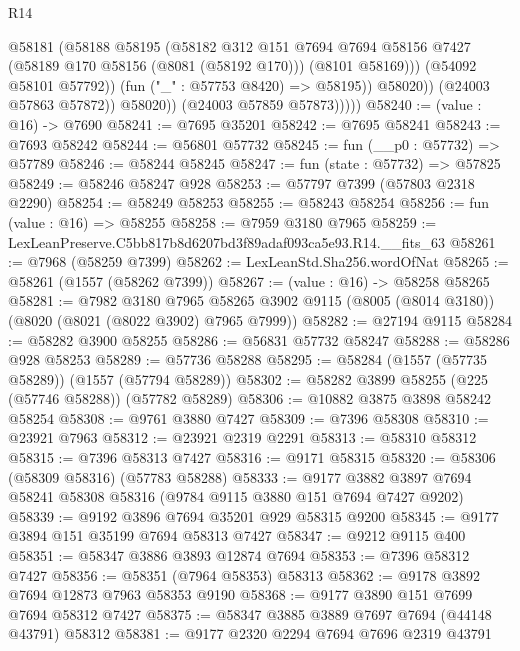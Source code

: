 \begin{lexlean}{R14}
\begin{coremodule}
                        @58181
                          (@58188
                            @58195
                            (@58182
                              @312
                              @151
                              @7694
                              @7694
                              @58156
                              @7427
                              (@58189 @170 @58156 (@8081 (@58192 @170)))
                              (@8101 @58169)))
                          (@54092 @58101 @57792))
                        (fun ("_" : @57753 @8420) => @58195))
                      @58020))
                  (@24003 @57863 @57872))
                @58020))
            (@24003 @57859 @57873)))))
@58240 := (value : @16) -> @7690
@58241 := @7695 @35201
@58242 := @7695 @58241
@58243 := @7693 @58242
@58244 := @56801 @57732
@58245 := fun (__p0 : @57732) => @57789
@58246 := @58244 @58245
@58247 := fun (state : @57732) => @57825
@58249 := @58246 @58247 @928
@58253 := @57797 @7399 (@57803 @2318 @2290)
@58254 := @58249 @58253
@58255 := @58243 @58254
@58256 := fun (value : @16) => @58255
@58258 := @7959 @3180 @7965
@58259 := LexLeanPreserve.C5bb817b8d6207bd3f89adaf093ca5e93.R14.__fits_63
@58261 := @7968 (@58259 @7399)
@58262 := LexLeanStd.Sha256.wordOfNat
@58265 := @58261 (@1557 (@58262 @7399))
@58267 := (value : @16) -> @58258 @58265
@58281 := @7982
    @3180
    @7965
    @58265
    @3902
    @9115
    (@8005 (@8014 @3180))
    (@8020 (@8021 (@8022 @3902) @7965 @7999))
@58282 := @27194 @9115
@58284 := @58282 @3900 @58255
@58286 := @56831 @57732 @58247
@58288 := @58286 @928 @58253
@58289 := @57736 @58288
@58295 := @58284 (@1557 (@57735 @58289)) (@1557 (@57794 @58289))
@58302 := @58282 @3899 @58255 (@225 (@57746 @58288)) (@57782 @58289)
@58306 := @10882 @3875 @3898 @58242 @58254
@58308 := @9761 @3880 @7427
@58309 := @7396 @58308
@58310 := @23921 @7963
@58312 := @23921 @2319 @2291
@58313 := @58310 @58312
@58315 := @7396 @58313 @7427
@58316 := @9171 @58315
@58320 := @58306 (@58309 @58316) (@57783 @58288)
@58333 := @9177 @3882 @3897 @7694 @58241 @58308 @58316 (@9784 @9115 @3880 @151 @7694 @7427 @9202)
@58339 := @9192 @3896 @7694 @35201 @929 @58315 @9200
@58345 := @9177 @3894 @151 @35199 @7694 @58313 @7427
@58347 := @9212 @9115 @400
@58351 := @58347 @3886 @3893 @12874 @7694
@58353 := @7396 @58312 @7427
@58356 := @58351 (@7964 @58353) @58313
@58362 := @9178 @3892 @7694 @12873 @7963 @58353 @9190
@58368 := @9177 @3890 @151 @7699 @7694 @58312 @7427
@58375 := @58347 @3885 @3889 @7697 @7694 (@44148 @43791) @58312
@58381 := @9177 @2320 @2294 @7694 @7696 @2319 @43791

\end{coremodule}
\end{lexlean}
